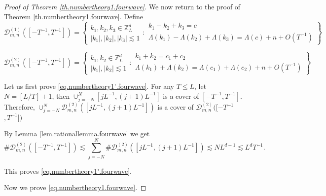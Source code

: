 \begin{proof}[Proof of Theorem \ref{th.numbertheory1.fourwave}]
We now return to the proof of Theorem \ref{th.numbertheory1.fourwave}. Define 
\begin{equation}
    \mathcal{D}^{(1)}_{m,n}([-T^{-1},T^{-1} ])=\left\{\begin{matrix}
k_1,k_2,k_3\in\mathbb{Z}_L^d \\
|k_1|,|k_2|,|k_3|\lesssim 1
\end{matrix}
:
\begin{matrix}
k_1-k_2+k_3=c \\
\Lambda(k_1)-\Lambda(k_2)+\Lambda(k_3)=\Lambda(c)+n+O(T^{-1})
\end{matrix}
\right\}
\end{equation}

\begin{equation}
    \mathcal{D}^{(2)}_{m,n}([-T^{-1},T^{-1} ])=\left
    \{\begin{matrix}
k_1,k_2\in\mathbb{Z}_L^d \\
|k_1|, |k_2|\lesssim 1
\end{matrix}
:
\begin{matrix}
k_1+ k_2=c_1+ c_{2} \\
\Lambda(k_1)+\Lambda(k_2)=\Lambda(c_1)+ \Lambda(c_2)+n+O(T^{-1})
\end{matrix}
\right\}
\end{equation}


Let us first prove \eqref{eq.numbertheory1'.fourwave}. For any $T\le L$, let $N=[L/T]+1$, then $\cup_{j=-N}^N [jL^{-1}, (j+1)L^{-1}]$ is a cover of $[-T^{-1}, T^{-1}]$. Therefore, $\cup_{j=-N}^N\mathcal{D}^{(2)}_{m,n}([jL^{-1}, (j+1)L^{-1}])$ is a cover of $\mathcal{D}^{(2)}_{m,n}([-T^{-1}$ $,T^{-1} ])$

By Lemma \ref{lem.rationallemma.fourwave} we get 
\begin{equation}\label{eq.thrationalexpand.fourwave}
    \#\mathcal{D}^{(2)}_{m,n}([-T^{-1},T^{-1} ])\lesssim \sum_{j=-N}^N\#\mathcal{D}^{(2)}_{m,n}([jL^{-1}, (j+1)L^{-1}])\lesssim NL^{d-1}\lesssim L^dT^{-1}.
\end{equation}

This proves \eqref{eq.numbertheory1'.fourwave}.

Now we prove \eqref{eq.numbertheory1.fourwave}. 


\end{proof}
